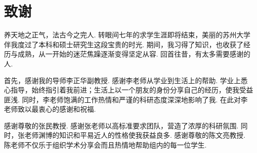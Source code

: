\chapter{致谢}

%
%
%
%
%
%
养天地之正气，法古今之完人.
转眼间七年的求学生涯即将结束，美丽的苏州大学伴我度过了本科和硕士研究生这段宝贵的时光.
期间，我习得了知识，也收获了经历与成熟，从一开始的迷茫焦躁逐渐变得坚定从容.
回首往昔，有太多需要感谢的人.


首先，感谢我的导师李正华副教授. 感谢李老师从学业到生活上的帮助. 学业上悉心指导，始终指引着我前进；生活上以一个朋友的身份分享自己的经历，使我受益匪浅.
同时，李老师饱满的工作热情和严谨的科研态度深深地影响了我. 在此对李老师致以最衷心的感谢和祝福.

感谢尊敬的张民教授. 感谢张老师以高标准要求团队，营造了浓厚的科研氛围. 同时，张老师渊博的知识和平易近人的性格使我获益良多.
感谢尊敬的陈文亮教授. 陈老师不仅乐于组织学术分享会而且热情地帮助组内的每一位学生.

